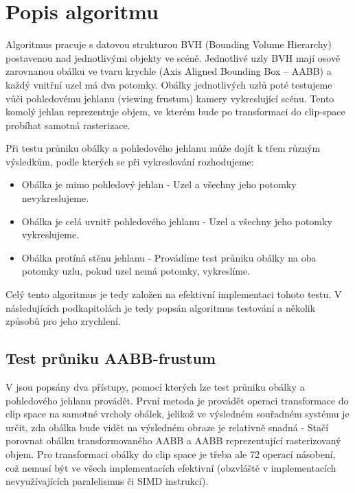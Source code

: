 \documentclass[report,11pt]{elsarticle}
\begin{document}
\section{\label{SEC:Description}Popis algoritmu}

Algoritmus pracuje s datovou strukturou BVH (Bounding Volume Hierarchy)
postavenou nad jednotlivými objekty ve scéně. Jednotlivé uzly BVH mají osově
zarovnanou obálku ve tvaru krychle (Axis Aligned Bounding Box -- AABB) a každý
vnitřní uzel má dva potomky. Obálky jednotlivých uzlů poté testujeme vůči
pohledovému jehlanu (viewing frustum) kamery vykreslující scénu. Tento komolý
jehlan reprezentuje objem, ve kterém bude po transformaci do clip-space probíhat
samotná rasterizace.

Při testu průniku obálky a pohledového jehlanu může dojít k třem různým
výsledkům, podle kterých se při vykreslování rozhodujeme:

\begin{itemize}
    \item Obálka je mimo pohledový jehlan - Uzel a všechny jeho potomky
          nevykreslujeme.
    \item Obálka je celá uvnitř pohledového jehlanu - Uzel a všechny jeho
          potomky vykreslujeme.
    \item Obálka protíná stěnu jehlanu - Provádíme test průniku obálky na oba potomky
          uzlu, pokud uzel nemá potomky, vykreslíme.
\end{itemize}

Celý tento algoritmus je tedy založen na efektivní implementaci tohoto testu.
V následujících podkapitolách je tedy popsán algoritmus testování a několik
způsobů pro jeho zrychlení.

\subsection{Test průniku AABB-frustum}

V \cite{assarsson2000optimized} jsou popsány dva přístupy, pomocí kterých lze
test průniku obálky a pohledového jehlanu provádět. První metoda je provádět
operaci transformace do clip space na samotné vrcholy obálek, jelikož ve
výsledném souřadném systému je určit, zda obálka bude vidět na výsledném obraze
je relativně snadná - Stačí porovnat obálku transformovaného AABB a AABB
reprezentující rasterizovaný objem. Pro transformaci obálky do clip space je
třeba ale 72 operací násobení, což nemusí být ve všech implementacích efektivní
(obzvláště v implementacích nevyužívajících paralelismus či SIMD instrukcí).
\end{document}
